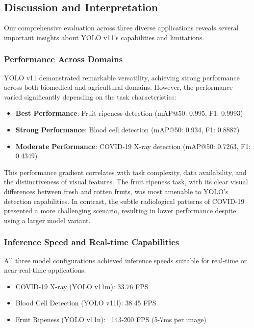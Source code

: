 \begin{multicols}{2}
\subsection{Discussion and Interpretation}

Our comprehensive evaluation across three diverse applications reveals several important insights about YOLO v11's capabilities and limitations.

\subsubsection{Performance Across Domains}

YOLO v11 demonstrated remarkable versatility, achieving strong performance across both biomedical and agricultural domains. However, the performance varied significantly depending on the task characteristics:

\begin{itemize}
    \item \textbf{Best Performance}: Fruit ripeness detection (mAP@50: 0.995, F1: 0.9993)
    \item \textbf{Strong Performance}: Blood cell detection (mAP@50: 0.934, F1: 0.8887)
    \item \textbf{Moderate Performance}: COVID-19 X-ray detection (mAP@50: 0.7263, F1: 0.4349)
\end{itemize}

This performance gradient correlates with task complexity, data availability, and the distinctiveness of visual features. The fruit ripeness task, with its clear visual differences between fresh and rotten fruits, was most amenable to YOLO's detection capabilities. In contrast, the subtle radiological patterns of COVID-19 presented a more challenging scenario, resulting in lower performance despite using a larger model variant.

\subsubsection{Inference Speed and Real-time Capabilities}

All three model configurations achieved inference speeds suitable for real-time or near-real-time applications:

\begin{itemize}
    \item COVID-19 X-ray (YOLO v11m): 33.76 FPS
    \item Blood Cell Detection (YOLO v11l): 38.45 FPS
    \item Fruit Ripeness (YOLO v11n): ~143-200 FPS (5-7ms per image)
\end{itemize}


\end{multicols}
